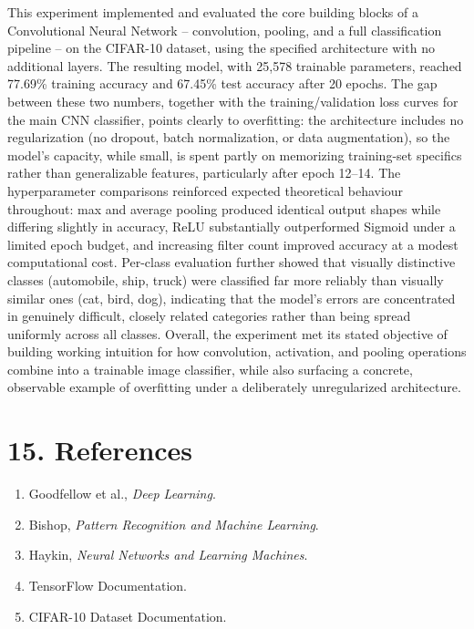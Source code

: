 \documentclass[11pt]{article}
\begin{document}
This experiment implemented and evaluated the core building blocks of a Convolutional Neural Network -- convolution, pooling, and a full classification pipeline -- on the CIFAR-10 dataset, using the specified architecture with no additional layers. The resulting model, with 25,578 trainable parameters, reached 77.69\% training accuracy and 67.45\% test accuracy after 20 epochs. The gap between these two numbers, together with the training/validation loss curves for the main CNN classifier, points clearly to overfitting: the architecture includes no regularization (no dropout, batch normalization, or data augmentation), so the model's capacity, while small, is spent partly on memorizing training-set specifics rather than generalizable features, particularly after epoch 12--14. The hyperparameter comparisons reinforced expected theoretical behaviour throughout: max and average pooling produced identical output shapes while differing slightly in accuracy, ReLU substantially outperformed Sigmoid under a limited epoch budget, and increasing filter count improved accuracy at a modest computational cost. Per-class evaluation further showed that visually distinctive classes (automobile, ship, truck) were classified far more reliably than visually similar ones (cat, bird, dog), indicating that the model's errors are concentrated in genuinely difficult, closely related categories rather than being spread uniformly across all classes. Overall, the experiment met its stated objective of building working intuition for how convolution, activation, and pooling operations combine into a trainable image classifier, while also surfacing a concrete, observable example of overfitting under a deliberately unregularized architecture.

\section*{15. References}

\begin{enumerate}
\item Goodfellow et al., \emph{Deep Learning}.
\item Bishop, \emph{Pattern Recognition and Machine Learning}.
\item Haykin, \emph{Neural Networks and Learning Machines}.
\item TensorFlow Documentation.
\item CIFAR-10 Dataset Documentation.
\end{enumerate}
\end{document}
